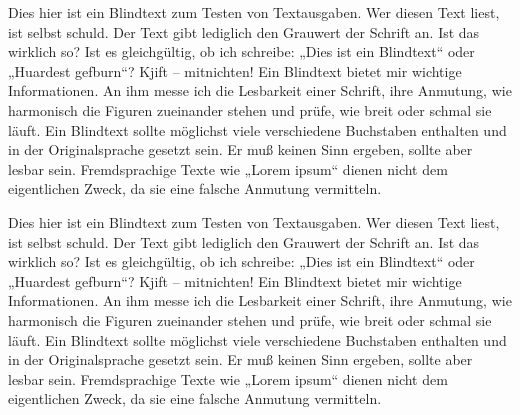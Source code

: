 \documentclass{book}
\begin{document}
\numberpstarttrue

\begin{pages}
\begin{Leftside}
\beginnumbering
\pstart
Dies hier ist ein Blindtext zum Testen von Textausgaben. Wer diesen
Text liest, ist selbst schuld. Der Text gibt lediglich den Grauwert der Schrift an.
Ist das wirklich so? Ist es gleichgültig, ob ich schreibe: „Dies ist ein Blindtext“
oder „Huardest gefburn“? Kjift – mitnichten! Ein Blindtext bietet mir wichtige
Informationen. An ihm messe ich die Lesbarkeit einer Schrift, ihre Anmutung,
wie harmonisch die Figuren zueinander stehen und prüfe, wie breit oder schmal
sie läuft. Ein Blindtext sollte möglichst viele verschiedene Buchstaben enthalten
und in der Originalsprache gesetzt sein. Er muß keinen Sinn ergeben, sollte
aber lesbar sein. Fremdsprachige Texte wie „Lorem ipsum“ dienen nicht dem
eigentlichen Zweck, da sie eine falsche Anmutung vermitteln.

\pend

\endnumbering   
\end{Leftside}

\begin{Rightside}
\beginnumbering
\pstart
Dies hier ist ein Blindtext zum Testen von Textausgaben. Wer diesen
Text liest, ist selbst schuld. Der Text gibt lediglich den Grauwert der Schrift an.
Ist das wirklich so? Ist es gleichgültig, ob ich schreibe: „Dies ist ein Blindtext“
oder „Huardest gefburn“? Kjift – mitnichten! Ein Blindtext bietet mir wichtige
Informationen. An ihm messe ich die Lesbarkeit einer Schrift, ihre Anmutung,
wie harmonisch die Figuren zueinander stehen und prüfe, wie breit oder schmal
sie läuft. Ein Blindtext sollte möglichst viele verschiedene Buchstaben enthalten
und in der Originalsprache gesetzt sein. Er muß keinen Sinn ergeben, sollte
aber lesbar sein. Fremdsprachige Texte wie „Lorem ipsum“ dienen nicht dem
eigentlichen Zweck, da sie eine falsche Anmutung vermitteln.
\pend

\endnumbering
\end{Rightside}
\end{pages}
\Pages
\end{document}
